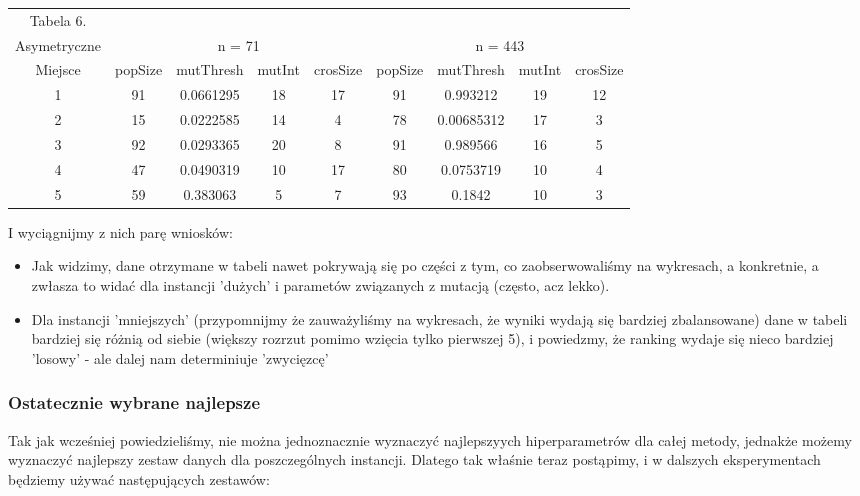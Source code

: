 \documentclass{article}
\begin{document}
\begin{table}[h!]
	\centering
	\begin{tabular}{c||c|c|c|c||c|c|c|c}
Tabela 6.\\
Asymetryczne & \multicolumn{4}{c}{n = 71} &\multicolumn{4}{c}{n = 443}\\
Miejsce & popSize & mutThresh & mutInt & crosSize & popSize & mutThresh & mutInt & crosSize \\
\hline
1 & 91 & 0.0661295 & 18 & 17 & 91 & 0.993212 & 19 & 12 \\
2 & 15 & 0.0222585 & 14 & 4 & 78 & 0.00685312 & 17 & 3 \\
3 & 92 & 0.0293365 & 20 & 8 & 91 & 0.989566 & 16 & 5 \\
4 & 47 & 0.0490319 & 10 & 17 & 80 & 0.0753719 & 10 & 4 \\
5 & 59 & 0.383063 & 5 & 7 & 93 & 0.1842 & 10 & 3 \\

	\end{tabular}
\end{table}

I wyciągnijmy z nich parę wniosków:
\begin{itemize}
	\item Jak widzimy, dane otrzymane w tabeli nawet pokrywają się po części z tym, co zaobserwowaliśmy na wykresach, a konkretnie, a zwłasza to widać dla instancji 'dużych' i parametów związanych z mutacją (często, acz lekko).
	\item Dla instancji 'mniejszych' (przypomnijmy że zauważyliśmy na wykresach, że wyniki wydają się bardziej zbalansowane) dane w tabeli bardziej się różnią od siebie (większy rozrzut pomimo wzięcia tylko pierwszej 5), i powiedzmy, że ranking wydaje się nieco bardziej 'losowy' - ale dalej nam determiniuje 'zwycięzcę'
\end{itemize}

\subsubsection{Ostatecznie wybrane najlepsze}
Tak jak wcześniej powiedzieliśmy, nie można jednoznacznie wyznaczyć najlepszyych hiperparametrów dla całej metody, jednakże możemy wyznaczyć najlepszy zestaw danych dla poszczególnych instancji. Dlatego tak właśnie teraz postąpimy, i w dalszych eksperymentach będziemy używać następujących zestawów:
\end{document}
